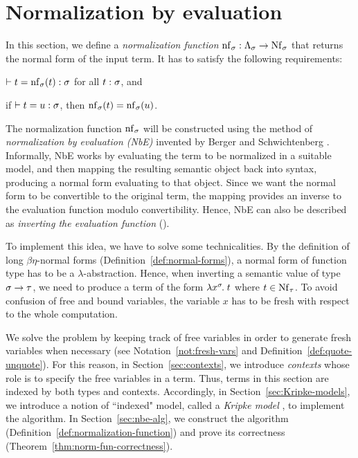 \section{Normalization by evaluation} \label{sec:nbe}

In this section, we define a \textit{normalization function} $\name{nf}_\sigma : \Tm[\sigma] \to \Nf[\sigma]$ that returns the normal form of the input term. It has to satisfy the following requirements:
\begin{enum}
\item $\vdash t = \mathrm{nf}_\sigma(t) : \sigma$ for all $t : \sigma$, and
\item if $\vdash t = u : \sigma$, then $\mathrm{nf}_\sigma(t) = \mathrm{nf}_\sigma(u)$.
\end{enum}

The normalization function $\mathrm{nf}_\sigma$ will be constructed using the method of \textit{normalization by evaluation (NbE)} invented by Berger and Schwichtenberg \cite{DBLP:conf/lics/BergerS91}. Informally, NbE works by evaluating the term to be normalized in a suitable model, and then mapping the resulting semantic object back into syntax, producing a normal form evaluating to that object. Since we want the normal form to be convertible to the original term, the mapping provides an inverse to the evaluation function modulo convertibility. Hence, NbE can also be described as \textit{inverting the evaluation function} (\cite{DBLP:conf/lics/BergerS91}).

To implement this idea, we have to solve some technicalities. By the definition of long $\beta\eta$-normal forms (Definition~\ref{def:normal-forms}), a normal form of function type has to be a $\lambda$-abstraction. Hence, when inverting a semantic value of type $\sigma \to \tau$, we need to produce a term of the form $\lambda x^{\sigma}\hspace{-1pt}.\;t$ where $t \in \Nf[\tau]$. To avoid confusion of free and bound variables, the variable $x$ has to be fresh with respect to the whole computation.

We solve the problem by keeping track of free variables in order to generate fresh variables when necessary (see Notation~\ref{not:fresh-vars} and Definition~\ref{def:quote-unquote}). For this reason, in Section~\ref{sec:contexts}, we introduce \textit{contexts} whose role is to specify the free variables in a term. Thus, terms in this section are indexed by both types and contexts. Accordingly, in Section~\ref{sec:Kripke-models}, we introduce a notion of ``indexed" model, called a \textit{Kripke model} \cite{DBLP:journals/apal/MitchellM91}, to implement the algorithm. In Section~\ref{sec:nbe-alg}, we construct the algorithm (Definition~\ref{def:normalization-function}) and prove its correctness (Theorem~\ref{thm:norm-fun-correctness}).

